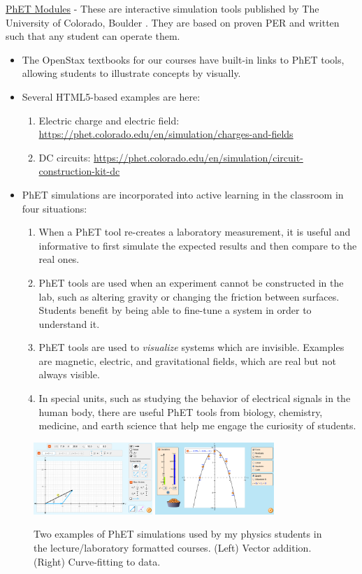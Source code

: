 \documentclass[../../../main.tex]{subfiles}
\begin{document}
\underline{PhET Modules} - These are interactive simulation tools published by The University of Colorado, Boulder \cite{phet}.  They are based on proven PER and written such that any student can operate them.
\begin{itemize}
\item The OpenStax textbooks for our courses have built-in links to PhET tools, allowing students to illustrate concepts by visually.
\item Several HTML5-based examples are here:
\begin{enumerate}
\item Electric charge and electric field: \url{https://phet.colorado.edu/en/simulation/charges-and-fields}
\item DC circuits: \url{https://phet.colorado.edu/en/simulation/circuit-construction-kit-dc}
\end{enumerate}
\item PhET simulations are incorporated into active learning in the classroom in four situations:
\begin{enumerate}
\item When a PhET tool re-creates a laboratory measurement, it is useful and informative to first simulate the expected results and then compare to the real ones.
\item PhET tools are used when an experiment cannot be constructed in the lab, such as altering gravity or changing the friction between surfaces.  Students benefit by being able to fine-tune a system in order to understand it.
\item PhET tools are used to \textit{visualize} systems which are invisible.  Examples are magnetic, electric, and gravitational fields, which are real but not always visible.
\item In special units, such as studying the behavior of electrical signals in the human body, there are useful PhET tools from biology, chemistry, medicine, and earth science that help me engage the curiosity of students.
\end{enumerate}
\end{itemize}

\begin{figure}
\centering
\includegraphics[width=0.4\textwidth]{figures/phet1.png}
\includegraphics[width=0.4\textwidth]{figures/phet2.png}
\caption{\label{fig:phet} Two examples of PhET simulations used by my physics students in the lecture/laboratory formatted courses.  (Left) Vector addition. (Right) Curve-fitting to data.}
\end{figure}
\end{document}
